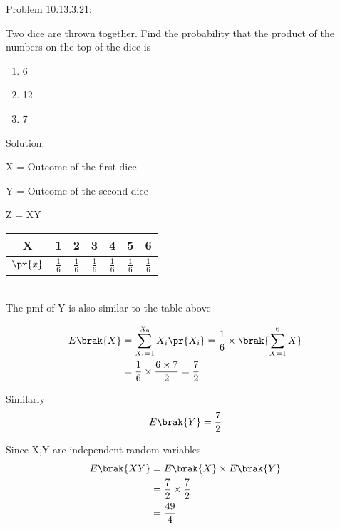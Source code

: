 \documentclass[journal,12pt,twocolumn]{IEEEtran}
\begin{document}
%
Problem 10.13.3.21:

Two dice are thrown together. Find the probability that the product of the numbers
on the top of the dice is
\begin{enumerate}
\item 6
\item 12
\item 7
\end{enumerate}
Solution:

X = Outcome of the first dice

Y = Outcome of the second dice

Z = XY\\

\begin{tabular}{|c|c|c|c|c|c|c|}
        \hline
        X & 1 & 2 & 3 & 4 & 5 & 6\\
        \hline
        $\pr{x}$ & $\frac{1}{6}$ & $\frac{1}{6}$ & $\frac{1}{6}$ & $\frac{1}{6}$ & $\frac{1}{6}$ &$\frac{1}{6}$\\
        \hline
    \end{tabular}\\

The pmf of Y is also similar to the table above

\begin{align}
E\brak{X}&=\sum_{X_i=1}^{X_6} X_i\pr{X_i}=\frac{1}{6}\times\brak{\sum_{X=1}^{6} X}\\
&=\frac{1}{6}\times\frac{6\times7}{2}=\frac{7}{2}
\end{align}

Similarly
\begin{align}
E\brak{Y}=\frac{7}{2}
\end{align}

Since X,Y are independent random variables
\begin{align}
E\brak{XY}&=E\brak{X}\times E\brak{Y}\\
&=\frac{7}{2}\times\frac{7}{2}\\
&=\frac{49}{4}
\end{align}
\end{document}
